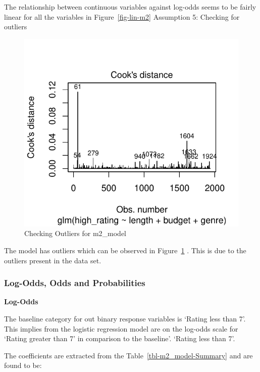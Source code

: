 \documentclass[
  letterpaper,
  DIV=11,
  numbers=noendperiod]{scrartcl}
\begin{document}
The relationship between continuous variables against log-odds seems to
be fairly linear for all the variables in Figure~\ref{fig-lin-m2}
\clearpage Assumption 5: Checking for outliers

\begin{figure}

{\centering \includegraphics{Group_06_Analysis_files/figure-pdf/fig-cook-m2-1.pdf}

}

\caption{\label{fig-cook-m2}Checking Outliers for m2\_model}

\end{figure}

The model has outliers which can be observed in Figure~\ref{fig-cook-m2}
. This is due to the outliers present in the data set.

\hypertarget{Sec-lop}{%
\subsubsection{Log-Odds, Odds and Probabilities}\label{Sec-lop}}

\textbf{Log-Odds}

The baseline category for out binary response variables is `Rating less
than 7'. This implies from the logistic regression model are on the
log-odds scale for `Rating greater than 7' in comparison to the
baseline'. `Rating less than 7'.

The coefficients are extracted from the Table~\ref{tbl-m2_model-Summary}
and are found to be:
\end{document}
